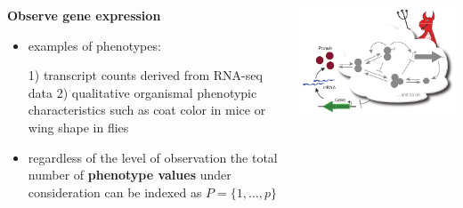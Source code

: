 \begin{frame}
\begin{columns}[c]
\begin{column}{0.5\textwidth}
\begin{block}{\textbf{Observe gene expression}}
\begin{itemize}
\item examples of phenotypes: \begin{small}
1) transcript counts derived from RNA-seq data 2) qualitative organismal phenotypic characteristics such as coat color in mice or wing shape in flies
\end{small}
\item regardless of the level of observation the total number of \textbf{phenotype values} under consideration can be indexed as $P = \{ 1, \ldots, p \} $
\end{itemize}
\end{block}
\end{column}
\begin{column}{0.5\textwidth}
\begin{center}
\includegraphics[width=1.0\textwidth]{fig/geneexpressiondemon.pdf}
\end{center}
\end{column}
\end{columns}
\end{frame}
